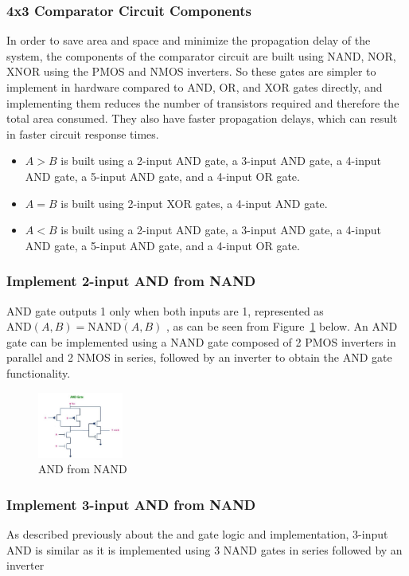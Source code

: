 \documentclass[conference]{IEEEtran}
\begin{document}
\subsubsection{4x3 Comparator Circuit Components}
In order to save area and space and minimize the propagation delay of the system, the components of the comparator circuit are built using NAND, NOR, XNOR using the PMOS and NMOS inverters. So these gates are simpler to implement in hardware compared to AND, OR, and XOR gates directly, and implementing them reduces the number of transistors required and therefore the total area consumed. They also have faster propagation delays, which can result in faster circuit response times.
\begin{itemize}
\item $A>B$ is built using a 2-input AND gate, a 3-input AND gate, a 4-input AND gate, a 5-input AND gate, and a 4-input OR gate.
\item $A=B$ is built using 2-input XOR gates, a 4-input AND gate.
\item $A<B$ is built using a 2-input AND gate, a 3-input AND gate, a 4-input AND gate, a 5-input AND gate, and a 4-input OR gate.
\end{itemize}

\subsubsection{Implement 2-input AND from NAND}
AND gate outputs 1 only when both inputs are 1, represented as \( \text{AND}(A, B) = \overline{\text{NAND}(A, B)} \)
, as can be seen from Figure~\ref{fig:ANDfromNAND} below. An AND gate can be implemented using a NAND gate composed of 2 PMOS inverters in parallel and 2 NMOS in series, followed by an inverter to obtain the AND gate functionality.
\begin{figure}[h]
    \centering
    \includegraphics[width=0.25\textwidth]{assets/AndUsingNand.jpg}
    \caption{AND from NAND}
    \label{fig:ANDfromNAND}
\end{figure}
\subsubsection{Implement 3-input AND from NAND}
As described previously about the and gate logic and implementation, 3-input AND is similar as it is implemented using 3 NAND gates in series followed by an inverter
\end{document}
